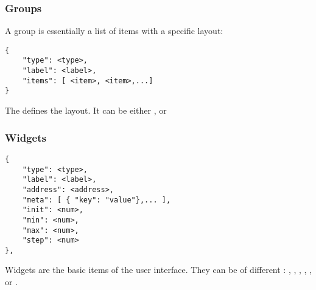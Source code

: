 \subsubsection*{Groups}
A group is essentially a list of items with a specific layout: 
\begin{lstlisting}
{
	"type": <type>,
	"label": <label>,
	"items": [ <item>, <item>,...]
}
\end{lstlisting}
The  defines the layout. It can be either ,  or 

\subsubsection*{Widgets}
\begin{lstlisting}
{
	"type": <type>,
	"label": <label>,
	"address": <address>,
	"meta": [ { "key": "value"},... ],
	"init": <num>,
	"min": <num>,
	"max": <num>,
	"step": <num>
},
\end{lstlisting}
Widgets are the basic items of the user interface. They can be of different  : ,  , , , ,  or .

